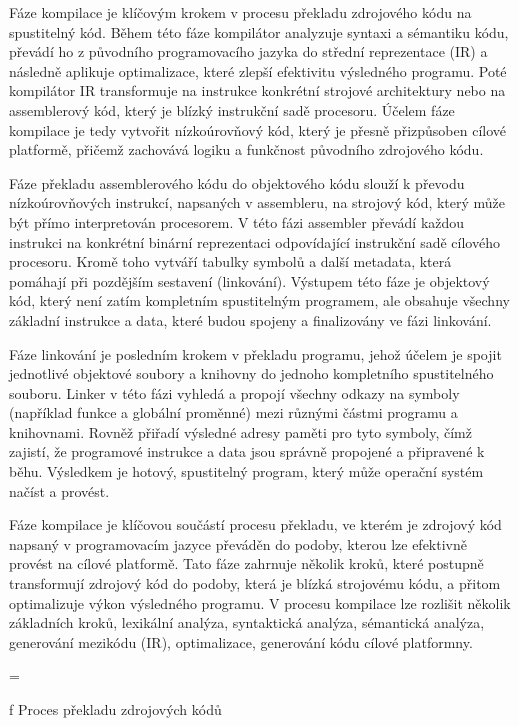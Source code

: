 Fáze kompilace je klíčovým krokem v procesu překladu zdrojového kódu na spustitelný kód. Během této fáze kompilátor analyzuje syntaxi a sémantiku kódu, převádí ho z původního programovacího jazyka do střední reprezentace (IR) a následně aplikuje optimalizace, které zlepší efektivitu výsledného programu. Poté kompilátor IR transformuje na instrukce konkrétní strojové architektury nebo na assemblerový kód, který je blízký instrukční sadě procesoru. Účelem fáze kompilace je tedy vytvořit nízkoúrovňový kód, který je přesně přizpůsoben cílové platformě, přičemž zachovává logiku a funkčnost původního zdrojového kódu.

Fáze překladu assemblerového kódu do objektového kódu slouží k převodu nízkoúrovňových instrukcí, napsaných v assembleru, na strojový kód, který může být přímo interpretován procesorem. V této fázi assembler převádí každou instrukci na konkrétní binární reprezentaci odpovídající instrukční sadě cílového procesoru. Kromě toho vytváří tabulky symbolů a další metadata, která pomáhají při pozdějším sestavení (linkování). Výstupem této fáze je objektový kód, který není zatím kompletním spustitelným programem, ale obsahuje všechny základní instrukce a data, které budou spojeny a finalizovány ve fázi linkování.

Fáze linkování je posledním krokem v překladu programu, jehož účelem je spojit jednotlivé objektové soubory a knihovny do jednoho kompletního spustitelného souboru. Linker v této fázi vyhledá a propojí všechny odkazy na symboly (například funkce a globální proměnné) mezi různými částmi programu a knihovnami. Rovněž přiřadí výsledné adresy paměti pro tyto symboly, čímž zajistí, že programové instrukce a data jsou správně propojené a připravené k běhu. Výsledkem je hotový, spustitelný program, který může operační systém načíst a provést.

Fáze kompilace je klíčovou součástí procesu překladu, ve kterém je zdrojový kód napsaný v programovacím jazyce převáděn do podoby, kterou lze efektivně provést na cílové platformě. Tato fáze zahrnuje několik kroků, které postupně transformují zdrojový kód do podoby, která je blízká strojovému kódu, a přitom optimalizuje výkon výsledného programu. V procesu kompilace lze rozlišit několik základních kroků, lexikální analýza, syntaktická analýza, sémantická analýza, generování mezikódu (IR), optimalizace, generování kódu cílové platformny.

\vskip 5mm
\picw=\hsize \centerline{ }\nobreak\medskip
\caption/f Proces překladu zdrojových kódů

